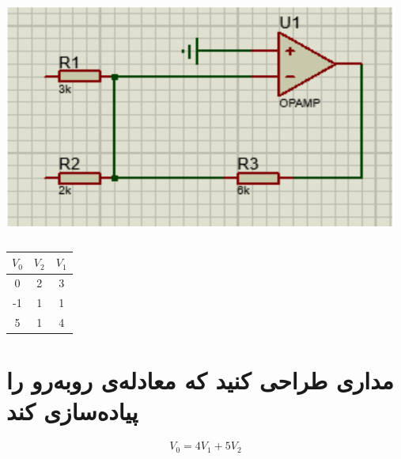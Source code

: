 \documentclass{article}
\begin{document}
		\begin{center}
			\includegraphics[width=13cm, height=8cm]{./images/4.3}	
        \end{center}
		
		\begin{table}[h]
			\begin{center}
				\begin{tabular}{|c|c|c|}
					\hline
					$V_0$ & $V_2$ & $V_1$ \\
					\hline
					\hline
					0 & 2 & 3\\
					\hline
					-1 & 1 & 1 \\
					\hline
					5 & 1 & 4\\
					\hline
				\end{tabular}
			\end{center}
		\end{table}
	\clearpage
	\section{مداری طراحی کنید که معادله‌ی روبه‌رو را پیاده‌سازی کند}
		\begin{equation*}
			V_0 = 4V_1 + 5V_2
		\end{equation*}
	
\end{document}
